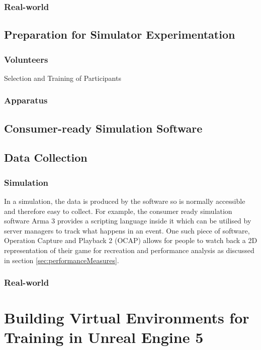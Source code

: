 \documentclass[12pt]{article}
\begin{document}
\subsubsection{Real-world}

\subsection{Preparation for Simulator Experimentation}

\subsubsection{Volunteers}

Selection and Training of Participants

\subsubsection{Apparatus}

\subsection{Consumer-ready Simulation Software}

\subsection{Data Collection}

\subsubsection{Simulation}

In a simulation, the data is produced by the software so is normally accessible and therefore easy to collect. For example, the consumer ready simulation software Arma 3 provides a scripting language inside it which can be utilised by server managers to track what happens in an event. One such piece of software, Operation Capture and Playback 2 (OCAP) allows for people to watch back a 2D representation of their game for recreation and performance analysis as discussed in section \ref{sec:performanceMeasures}.

\subsubsection{Real-world}

\section{Building Virtual Environments for Training in Unreal Engine 5}
\end{document}
